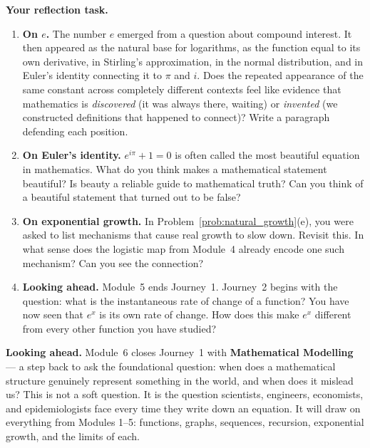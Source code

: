\documentclass[12pt, a4paper]{article}
\begin{document}
\begin{reflectionbox}
\textbf{Your reflection task.}

\begin{enumerate}
  \item \textbf{On $e$.} The number $e$ emerged from a question about compound interest. It then appeared as the natural base for logarithms, as the function equal to its own derivative, in Stirling's approximation, in the normal distribution, and in Euler's identity connecting it to $\pi$ and $i$. Does the repeated appearance of the same constant across completely different contexts feel like evidence that mathematics is \emph{discovered} (it was always there, waiting) or \emph{invented} (we constructed definitions that happened to connect)? Write a paragraph defending each position.

  \item \textbf{On Euler's identity.} $e^{i\pi} + 1 = 0$ is often called the most beautiful equation in mathematics. What do you think makes a mathematical statement beautiful? Is beauty a reliable guide to mathematical truth? Can you think of a beautiful statement that turned out to be false?

  \item \textbf{On exponential growth.} In Problem~\ref{prob:natural_growth}(e), you were asked to list mechanisms that cause real growth to slow down. Revisit this. In what sense does the logistic map from Module~4 already encode one such mechanism? Can you see the connection?

  \item \textbf{Looking ahead.} Module~5 ends Journey~1. Journey~2 begins with the question: what is the instantaneous rate of change of a function? You have now seen that $e^x$ is its own rate of change. How does this make $e^x$ different from every other function you have studied?
\end{enumerate}
\end{reflectionbox}

\medskip
\noindent\textbf{Looking ahead.}
Module~6 closes Journey~1 with \textbf{Mathematical Modelling} --- a step back to ask the foundational question: when does a mathematical structure genuinely represent something in the world, and when does it mislead us? This is not a soft question. It is the question scientists, engineers, economists, and epidemiologists face every time they write down an equation. It will draw on everything from Modules 1--5: functions, graphs, sequences, recursion, exponential growth, and the limits of each.
\end{document}
